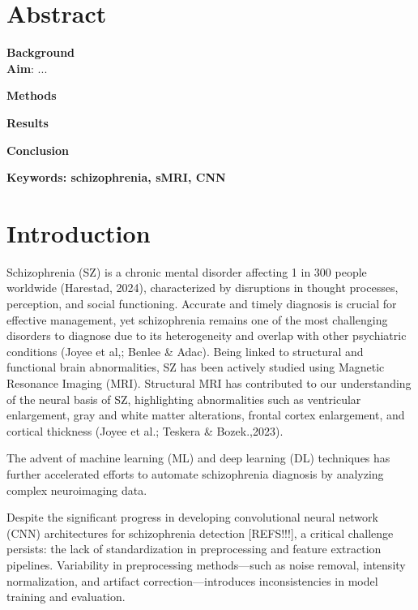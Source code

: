 



\maketitle

\section{Abstract}

\textbf{Background}\\
\lipsum[1]
\textbf{Aim}: ...

\textbf{Methods}\\
\lipsum[1]

\textbf{Results}\\
\lipsum[1]

\textbf{Conclusion}\\
\lipsum[1]

\textbf{Keywords: schizophrenia, sMRI, CNN}

\section{Introduction}

Schizophrenia (SZ) is a chronic mental disorder affecting 1 in 300 people worldwide (Harestad, 2024), characterized by disruptions in thought processes, perception, and social functioning. Accurate and timely diagnosis is crucial for effective management, yet schizophrenia remains one of the most challenging disorders to diagnose due to its heterogeneity and overlap with other psychiatric conditions (Joyee et al,; Benlee & Adac). Being linked to structural and functional brain abnormalities, SZ has been actively studied using Magnetic Resonance Imaging (MRI). Structural MRI has contributed to our understanding of the neural basis of SZ, highlighting abnormalities such as ventricular enlargement, gray and white matter alterations, frontal cortex enlargement, and cortical thickness (Joyee et al.; Teskera & Bozek.,2023).


The advent of machine learning (ML) and deep learning (DL) techniques has further accelerated efforts to automate schizophrenia diagnosis by analyzing complex neuroimaging data.

Despite the significant progress in developing convolutional neural network (CNN) architectures for schizophrenia detection [REFS!!!], a critical challenge persists: the lack of standardization in preprocessing and feature extraction pipelines. Variability in preprocessing methods---such as noise removal, intensity normalization, and artifact correction---introduces inconsistencies in model training and evaluation.

